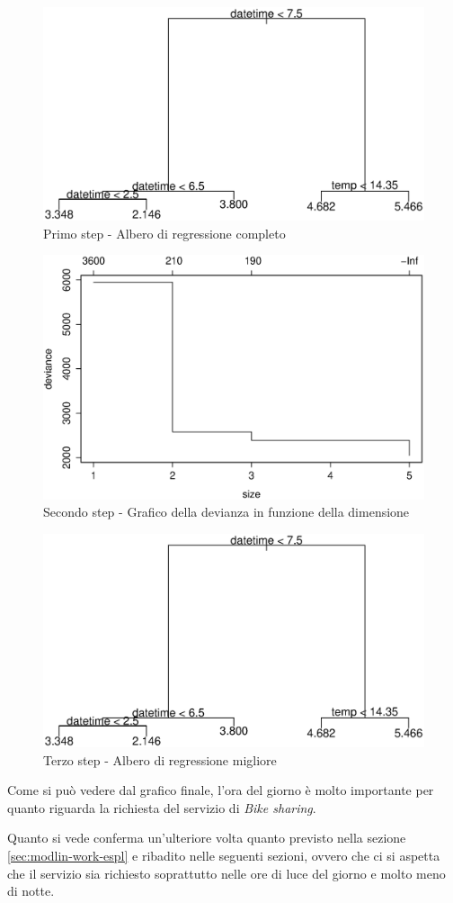 \begin{figure}[H]
  \centering
  \includegraphics[width=.7\columnwidth]{images/non-linear/tree-1.eps}
  \caption{Primo step - Albero di regressione completo}
  \label{fig:tree-1}
\end{figure}

\begin{figure}[H]
  \centering
  \includegraphics[width=.7\columnwidth]{images/non-linear/tree-2.eps}
  \caption{Secondo step - Grafico della devianza in funzione della dimensione}
  \label{fig:tree-2}
\end{figure}

\begin{figure}[H]
  \centering
  \includegraphics[width=.7\columnwidth]{images/non-linear/tree-3.eps}
  \caption{Terzo step - Albero di regressione migliore}
  \label{fig:tree-3}
\end{figure}

Come si può vedere dal grafico finale, l'ora del giorno è molto importante per
quanto riguarda la richiesta del servizio di \emph{Bike sharing}.

Quanto si vede conferma un'ulteriore volta quanto previsto nella sezione
\ref{sec:modlin-work-espl} e ribadito nelle seguenti sezioni, ovvero che ci si
aspetta che il servizio sia richiesto soprattutto nelle ore di luce del
giorno e molto meno di notte.

